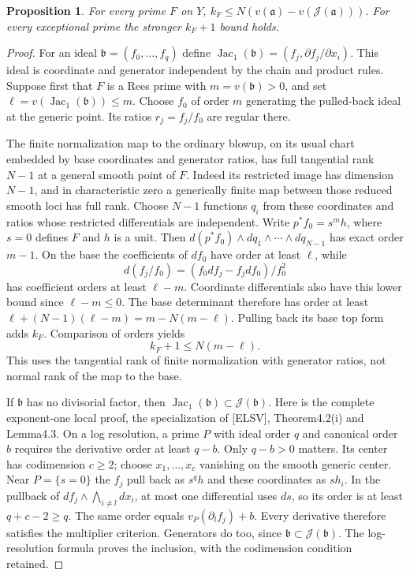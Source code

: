 \documentclass[11pt]{article}
\newcommand{\J}{\mathcal J}
\newcommand{\Jac}{\operatorname{Jac}}
\newtheorem{proposition}[theorem]{Proposition}
\begin{document}
\begin{proposition}
For every prime $F$ on $Y$,
$k_F\leq N(v(\mathfrak a)-v(\J(\mathfrak a)))$.
For every exceptional prime the stronger $k_F+1$ bound holds.
\end{proposition}
\begin{proof}
For an ideal $\mathfrak b=(f_0,\ldots,f_q)$ define
$\Jac_1(\mathfrak b)=(f_j,\partial f_j/\partial x_i)$.
This ideal is coordinate and generator independent by the chain
and product rules. Suppose first that $F$ is a Rees prime with
$m=v(\mathfrak b)>0$, and set $\ell=v(\Jac_1(\mathfrak b))\leq m$.
Choose $f_0$ of order $m$ generating the pulled-back ideal at the
generic point. Its ratios $r_j=f_j/f_0$ are regular there.

The finite normalization map to the ordinary blowup, on its usual
chart embedded by base coordinates and generator ratios, has full
tangential rank $N-1$ at a general smooth point of $F$.
Indeed its restricted image has dimension $N-1$, and in
characteristic zero a generically finite map between those reduced
smooth loci has full rank. Choose $N-1$ functions $q_i$ from these
coordinates and ratios whose restricted differentials are independent.
Write $p^*f_0=s^m h$, where $s=0$ defines $F$ and $h$ is a unit.
Then $d(p^*f_0)\wedge dq_1\wedge\cdots\wedge dq_{N-1}$ has exact
order $m-1$. On the base the coefficients of $df_0$ have order at
least $\ell$, while
\[
 d(f_j/f_0)=(f_0df_j-f_jdf_0)/f_0^2
\]
has coefficient orders at least $\ell-m$.
Coordinate differentials also have this lower bound since
$\ell-m\leq0$. The base determinant therefore has order at least
$\ell+(N-1)(\ell-m)=m-N(m-\ell)$. Pulling back its base top form
adds $k_F$. Comparison of orders yields
\[
 k_F+1\leq N(m-\ell).                                    \tag{24}
\]
This uses the tangential rank of finite normalization with generator
ratios, not normal rank of the map to the base.

If $\mathfrak b$ has no divisorial factor, then
$\Jac_1(\mathfrak b)\subset\J(\mathfrak b)$.
Here is the complete exponent-one local proof, the specialization
of [ELSV], Theorem4.2(i) and Lemma4.3.
On a log resolution, a prime $P$ with ideal order $q$ and canonical
order $b$ requires the derivative order at least $q-b$.
Only $q-b>0$ matters. Its center has codimension $c\geq2$;
choose $x_1,\ldots,x_c$ vanishing on the smooth generic center.
Near $P=\{s=0\}$ the $f_j$ pull back as $s^q h$ and these
coordinates as $s h_i$. In the pullback of
$df_j\wedge\bigwedge_{i\ne l}dx_i$, at most one differential
uses $ds$, so its order is at least $q+c-2\geq q$.
The same order equals $v_P(\partial_lf_j)+b$.
Every derivative therefore satisfies the multiplier criterion.
Generators do too, since $\mathfrak b\subset\J(\mathfrak b)$.
The log-resolution formula proves the inclusion, with the
codimension condition retained.


\end{proof}
\end{document}

